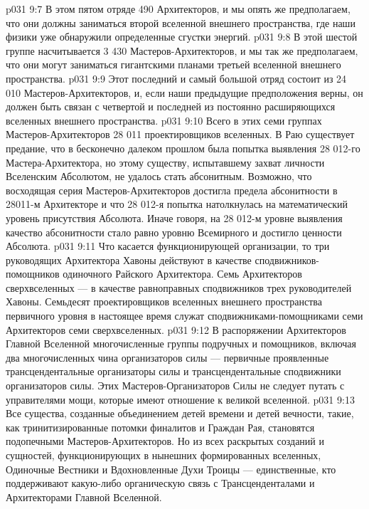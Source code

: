 \vs p031 9:7 \pc {}\bibnobreakspace {} В этом пятом отряде 490 Архитекторов, и мы опять же предполагаем, что они должны заниматься второй вселенной внешнего пространства, где наши физики уже обнаружили определенные сгустки энергий.
\vs p031 9:8 \pc {}\bibnobreakspace {} В этой шестой группе насчитывается 3 430 Мастеров\hyp{}Архитекторов, и мы так же предполагаем, что они могут заниматься гигантскими планами третьей вселенной внешнего пространства.
\vs p031 9:9 \pc {}\bibnobreakspace {} Этот последний и самый большой отряд состоит из 24 010 Мастеров\hyp{}Архитекторов, и, если наши предыдущие предположения верны, он должен быть связан с четвертой и последней из постоянно расширяющихся вселенных внешнего пространства.
\vs p031 9:10 \pc Всего в этих семи группах Мастеров\hyp{}Архитекторов 28 011 проектировщиков вселенных. В Раю существует предание, что в бесконечно далеком прошлом была попытка выявления 28 012\hyp{}го Мастера\hyp{}Архитектора, но этому существу, испытавшему захват личности Вселенским Абсолютом, не удалось стать абсонитным. Возможно, что восходящая серия Мастеров\hyp{}Архитекторов достигла предела абсонитности в 28011\hyp{}м Архитекторе и что 28 012\hyp{}я попытка натолкнулась на математический уровень присутствия Абсолюта. Иначе говоря, на 28 012\hyp{}м уровне выявления качество абсонитности стало равно уровню Всемирного и достигло ценности Абсолюта.
\vs p031 9:11 \pc Что касается функционирующей организации, то три руководящих Архитектора Хавоны действуют в качестве сподвижников\hyp{}помощников одиночного Райского Архитектора. Семь Архитекторов сверхвселенных --- в качестве равноправных сподвижников трех руководителей Хавоны. Семьдесят проектировщиков вселенных внешнего пространства первичного уровня в настоящее время служат сподвижниками\hyp{}помощниками семи Архитекторов семи сверхвселенных.
\vs p031 9:12 В распоряжении Архитекторов Главной Вселенной многочисленные группы подручных и помощников, включая два многочисленных чина организаторов силы --- первичные проявленные трансцендентальные организаторы силы и трансцендентальные сподвижники организаторов силы. Этих Мастеров\hyp{}Организаторов Силы не следует путать с управителями мощи, которые имеют отношение к великой вселенной.
\vs p031 9:13 Все существа, созданные объединением детей времени и детей вечности, такие, как тринитизированные потомки финалитов и Граждан Рая, становятся подопечными Мастеров\hyp{}Архитекторов. Но из всех раскрытых созданий и сущностей, функционирующих в нынешних формированных вселенных, Одиночные Вестники и Вдохновленные Духи Троицы --- единственные, кто поддерживают какую\hyp{}либо органическую связь с Трансценденталами и Архитекторами Главной Вселенной.
